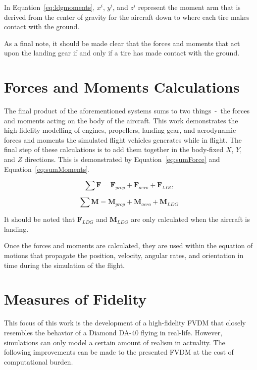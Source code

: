 In Equation~\ref{eq:ldgmoments}, \(x^i\), \(y^i\), and \(z^i\) represent the moment arm that is derived from the center of gravity for the aircraft down to where each tire makes contact with the ground.

As a final note, it should be made clear that the forces and moments that act upon the landing gear if and only if a tire has made contact with the ground.

\section{\textbf{Forces and Moments Calculations}}
The final product of the aforementioned systems sums to two things~-~the forces and moments acting on the body of the aircraft. This work demonstrates the high-fidelity modelling of engines, propellers, landing gear, and aerodynamic forces and moments the simulated flight vehicles generates while in flight. The final step of these calculations is to add them together in the body-fixed \(X\), \(Y\), and \(Z\) directions. This is demonstrated by Equation~\ref{eq:sumForce} and Equation~\ref{eq:sumMoments}.

\begin{equation}
    \sum \mathbf{F} = \mathbf{F}_{prop} + \mathbf{F}_{aero} + \mathbf{F}_{LDG}
    \label{eq:sumForce}
\end{equation}

\begin{equation}
    \sum \mathbf{M} = \mathbf{M}_{prop} + \mathbf{M}_{aero} + \mathbf{M}_{LDG}
    \label{eq:sumMoments}
\end{equation}

It should be noted that \(\mathbf{F}_{LDG}\) and \(\mathbf{M}_{LDG}\) are only calculated when the aircraft is landing.

Once the forces and moments are calculated, they are used within the equation of motions that propagate the position, velocity, angular rates, and orientation in time during the simulation of the flight.

\section{\textbf{Measures of Fidelity}}
This focus of this work is the development of a high-fidelity FVDM that closely resembles the behavior of a Diamond DA-40 flying in real-life. However, simulations can only model a certain amount of realism in actuality. The following improvements can be made to the presented FVDM at the cost of computational burden.

